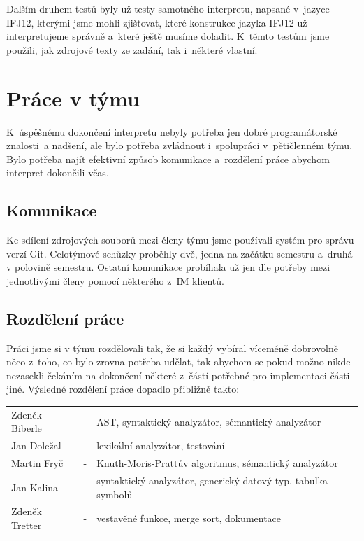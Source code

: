 \documentclass[12pt,a4paper,titlepage,final]{article}
\begin{document}
Dalším druhem testů byly už testy samotného interpretu, napsané v~jazyce IFJ12, 
kterými jsme mohli zjišťovat, které konstrukce jazyka IFJ12 už interpretujeme 
správně a~které ještě musíme doladit. K~těmto testům jsme použili, jak zdrojové 
texty ze zadání, tak i~některé vlastní.

\section{Práce v týmu} \label{prace_v_tymu}
K~úspěšnému dokončení interpretu nebyly potřeba jen dobré programátorské 
znalosti~a nadšení, ale bylo potřeba zvládnout i~spolupráci v~pětičlenném týmu. 
Bylo potřeba najít efektivní způsob komunikace a~rozdělení práce abychom interpret 
dokončili včas.
\subsection{Komunikace}
Ke sdílení zdrojových souborů mezi členy týmu jsme používali systém pro 
správu verzí Git. Celotýmové schůzky proběhly dvě, jedna na začátku semestru 
a~druhá v polovině semestru. Ostatní komunikace probíhala už jen dle potřeby mezi 
jednotlivými členy pomocí některého z~IM klientů.
\subsection{Rozdělení práce}
Práci jsme si v týmu rozdělovali tak, že si každý vybíral víceméně dobrovolně 
něco z~toho, co bylo zrovna potřeba udělat, tak abychom se pokud možno nikde 
nezasekli čekáním na dokončení některé z~částí potřebné pro implementaci části jiné.
\newline\newline
Výsledné rozdělení práce dopadlo přibližně takto: \medskip

\begin{tabular}{llp{12.4cm}}
Zdeněk Biberle & - & AST, syntaktický analyzátor, sémantický analyzátor\\
Jan Doležal    & - & lexikální analyzátor, testování\\
Martin Fryč    & - & Knuth-Moris-Prattův algoritmus, sémantický analyzátor\\
Jan Kalina     & - & syntaktický analyzátor, generický datový typ, tabulka symbolů\\
Zdeněk Tretter & - & vestavěné funkce, merge sort, dokumentace\\
\end{tabular}
\end{document}

